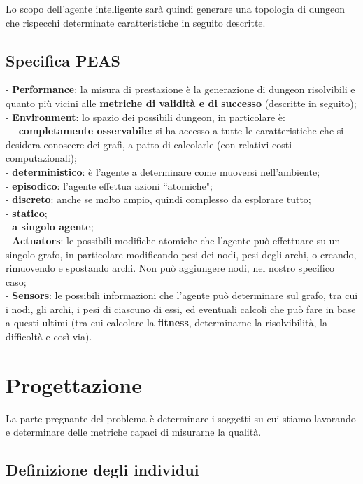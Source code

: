 \documentclass[12pt,titlepage]{article}
\begin{document}
Lo scopo dell'agente intelligente sarà quindi generare una topologia di dungeon che rispecchi determinate caratteristiche in seguito descritte.

\subsection {Specifica PEAS}

- \textbf{Performance}: la misura di prestazione è la generazione di dungeon risolvibili e quanto più vicini alle \textbf{metriche di validità e di successo} (descritte in seguito);\\
- \textbf{Environment}: lo spazio dei possibili dungeon, in particolare è:\\
\indent --- \textbf{completamente osservabile}: si ha accesso a tutte le caratteristiche che si desidera conoscere dei grafi, a patto di calcolarle (con relativi costi computazionali);\\
\indent- \textbf{deterministico}: è l'agente a determinare come muoversi nell'ambiente;\\
\indent- \textbf{episodico}: l'agente effettua azioni ``atomiche";\\
\indent- \textbf{discreto}: anche se molto ampio, quindi complesso da esplorare tutto;\\
\indent- \textbf{statico};\\
\indent- \textbf{a singolo agente};\\
- \textbf{Actuators}: le possibili modifiche atomiche che l'agente può effettuare su un singolo grafo, in particolare modificando pesi dei nodi, pesi degli archi, o creando, rimuovendo e spostando archi. Non può aggiungere nodi, nel nostro specifico caso;\\
- \textbf{Sensors}: le possibili informazioni che l'agente può determinare sul grafo, tra cui i nodi, gli archi, i pesi di ciascuno di essi, ed eventuali calcoli che può fare in base a questi ultimi (tra cui calcolare la \textbf{fitness}, determinarne la risolvibilità, la difficoltà e così via).

\section{Progettazione}

La parte pregnante del problema è determinare i soggetti su cui stiamo lavorando e determinare delle metriche capaci di misurarne la qualità.

\subsection {Definizione degli individui}
\end{document}
